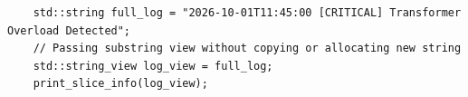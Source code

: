\begin{verbatim}
    std::string full_log = "2026-10-01T11:45:00 [CRITICAL] Transformer Overload Detected";
    // Passing substring view without copying or allocating new string
    std::string_view log_view = full_log;
    print_slice_info(log_view);
\end{verbatim}
